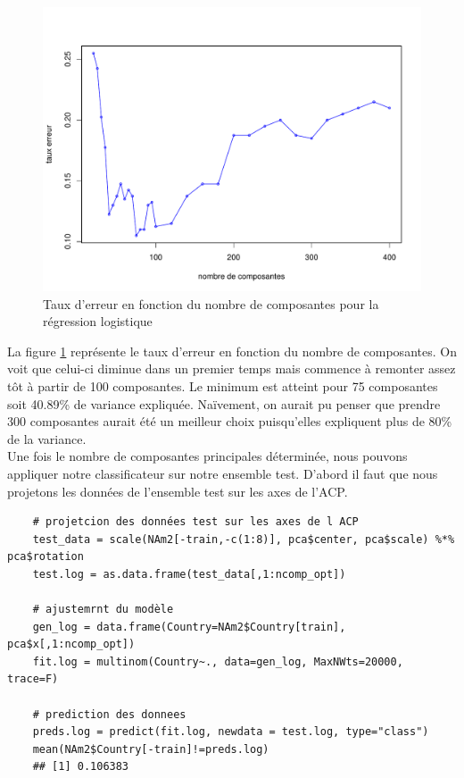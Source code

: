 \documentclass[12pt,a4paper]{article}
\begin{document}
\begin{figure}[h!]
	\begin{center}
		\includegraphics[scale=0.5]{figures/nopt_log.pdf}
		\caption{Taux d'erreur en fonction du nombre de composantes pour la régression logistique}
		\label{fig:nopt_log}
	\end{center}
\end{figure}
La figure \ref{fig:nopt_log} représente le taux d'erreur en fonction du nombre de composantes. On voit que celui-ci diminue dans un premier temps mais commence à remonter assez tôt à partir de 100 composantes. Le minimum est atteint pour 75 composantes soit 40.89\% de variance expliquée. Naïvement, on aurait pu penser que prendre 300 composantes aurait été un meilleur choix puisqu'elles expliquent plus de 80\% de la variance.\vspace{3mm}\\
Une fois le nombre de composantes principales déterminée, nous pouvons appliquer notre classificateur sur notre ensemble test. D'abord il faut que nous projetons les données de l'ensemble test sur les axes de l'ACP.
\begin{lstlisting}
	# projetcion des données test sur les axes de l ACP
	test_data = scale(NAm2[-train,-c(1:8)], pca$center, pca$scale) %*% pca$rotation
	test.log = as.data.frame(test_data[,1:ncomp_opt])
	
	# ajustemrnt du modèle
	gen_log = data.frame(Country=NAm2$Country[train], pca$x[,1:ncomp_opt])
	fit.log = multinom(Country~., data=gen_log, MaxNWts=20000, trace=F)
	
	# prediction des donnees
	preds.log = predict(fit.log, newdata = test.log, type="class")
	mean(NAm2$Country[-train]!=preds.log)
	## [1] 0.106383
\end{lstlisting}
\end{document}
